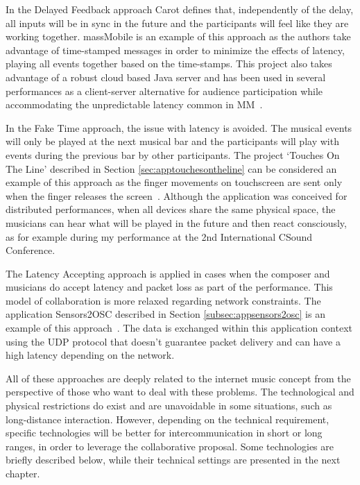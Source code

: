 In the Delayed Feedback approach Carot defines that, independently of the delay, all inputs will be in sync in the future and the participants will feel like they are working together.
massMobile is an example of this approach as the authors take advantage of time-stamped messages in order to minimize the effects of latency, playing all events together based on the time-stamps.
This project also takes advantage of a robust cloud based Java server and has been used in several performances as a client-server alternative for audience participation while accommodating the unpredictable latency common in MM~\citep{Weitzner2012massmobile}. 

In the Fake Time approach, the issue with latency is avoided.
The musical events will only be played at the next musical bar and the participants will play with events during the previous bar by other participants.
The project `Touches On The Line' described in Section \ref{sec:apptouchesontheline} can be considered an example of this approach as the finger movements on touchscreen are sent only when the finger releases the screen~\cite{deCarvalhoJunior2013touches}.
Although the application was conceived for distributed performances, when all devices share the same physical space, the musicians can hear what will be played in the future and then react consciously, as for example during my performance at the 2nd International CSound Conference. 

The Latency Accepting approach is applied in cases when the composer and musicians do accept latency and packet loss as part of the performance.
This model of collaboration is more relaxed regarding network constraints.
The application Sensors2OSC described in Section \ref{subsec:appsensors2osc} is an example of this approach~\citep{deCarvalhoJunior2015sensors2osc}.
The data is exchanged within this application context using the UDP protocol that doesn't guarantee packet delivery and can have a high latency depending on the network.

All of these approaches are deeply related to the internet music concept from the perspective of those who want to deal with these problems.
The technological and physical restrictions do exist and are unavoidable in some situations, such as long-distance interaction.
However, depending on the technical requirement, specific technologies will be better for intercommunication in short or long ranges, in order to leverage the collaborative proposal.
Some technologies are briefly described below, while their technical settings are presented in the next chapter.

